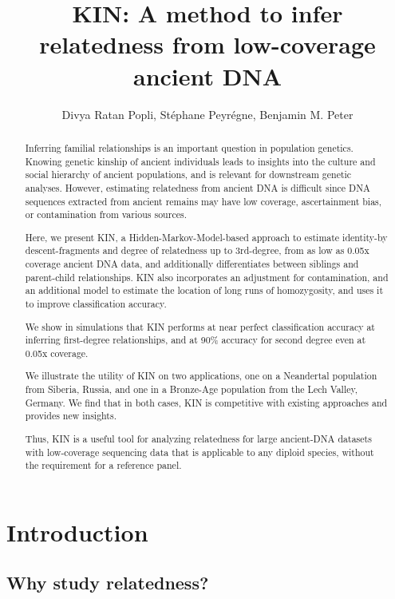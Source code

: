 \documentclass[12pt, letterpaper]{article}
\title{KIN: A method to infer relatedness from low-coverage ancient DNA}
\author{Divya Ratan Popli, Stéphane Peyrégne, Benjamin M. Peter}
\begin{document}
\nolinenumbers

\maketitle

\begin{abstract}

\noindent Inferring familial relationships is an important question in population genetics. Knowing genetic kinship of ancient individuals leads to insights into the culture and social hierarchy of ancient populations, and is  relevant for downstream genetic analyses. However, estimating relatedness from ancient DNA is difficult since DNA sequences extracted from ancient remains may have low coverage, ascertainment bias, or contamination from various sources. 

Here, we present KIN, a Hidden-Markov-Model-based approach to estimate identity-by descent-fragments and degree of relatedness up to 3rd-degree, from as low as 0.05x coverage ancient DNA data, and additionally differentiates between siblings and parent-child relationships. KIN also incorporates an adjustment for contamination, and an additional model to estimate the location of long runs of homozygosity, and uses it to improve classification accuracy.

We show in simulations that KIN performs at near perfect classification accuracy at inferring first-degree relationships, and at 90\% accuracy for second degree even at 0.05x coverage.

We illustrate the utility of KIN on two applications, one on a Neandertal population from Siberia, Russia, and one in a Bronze-Age population from the Lech Valley, Germany. 
We find that in both cases, KIN is competitive with existing approaches and provides new insights. 

Thus, KIN is a useful tool for analyzing relatedness for large ancient-DNA datasets with low-coverage sequencing data that is applicable to any diploid species, without the requirement for a reference panel.
\end{abstract}

\section{Introduction}

\subsection{Why study relatedness?}
\end{document}
